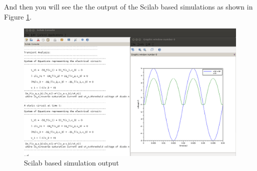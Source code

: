 And then you will see the the output of the Scilab based simulations as shown in Figure \ref{sci}.

\begin{figure}[h]%
\begin{center}
\includegraphics[width=1\linewidth]{figures/SMCSim-simulation.png}%
\caption{Scilab based simulation output}
\label{sci}
\end{center}
\end{figure}





